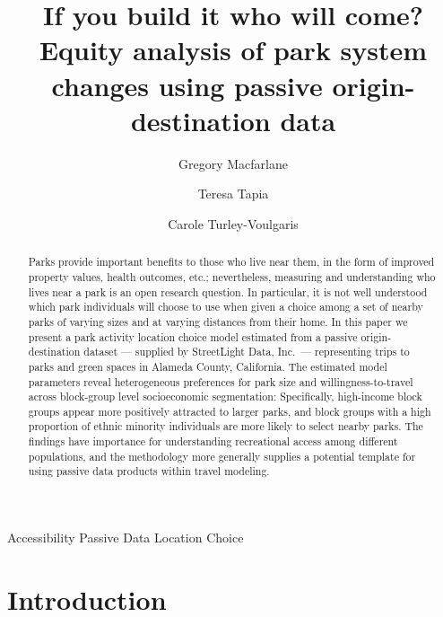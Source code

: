 \documentclass[3p, authoryear]{elsarticle} %
\begin{document}
\begin{frontmatter}

  \title{If you build it who will come? Equity analysis of park system changes using passive origin-destination data}
    \author[BYU]{Gregory Macfarlane}
    \author[StreetLight]{Teresa Tapia}
    \author[Harvard]{Carole Turley-Voulgaris}
      \address[BYU]{Brigham Young University, Civil and Environmental Engineering Department, 430 Engineering Building, Provo, Utah 84602}
    \address[Harvard]{Harvard Graduate School of Design, 48 Quincy St, Cambridge, Massachussetts 02138}
    \address[StreetLight]{StreetLight Data, Inc., San Francisco, California}
  
  \begin{abstract}
  Parks provide important benefits to those who live near them, in the form of improved property values, health outcomes, etc.; nevertheless, measuring and understanding who lives near a park is an open research question. In particular, it is not well understood which park individuals will choose to use when given a choice among a set of nearby parks of varying sizes and at varying distances from their home. In this paper we present a park activity location choice model estimated from a passive origin-destination dataset --- supplied by StreetLight Data, Inc.~--- representing trips to parks and green spaces in Alameda County, California. The estimated model parameters reveal heterogeneous preferences for park size and willingness-to-travel across block-group level socioeconomic segmentation: Specifically, high-income block groups appear more positively attracted to larger parks, and block groups with a high proportion of ethnic minority individuals are more likely to select nearby parks. The findings have importance for understanding recreational access among different populations, and the methodology more generally supplies a potential template for using passive data products within travel modeling.
  \end{abstract}
   \begin{keyword} Accessibility Passive Data Location Choice\end{keyword}
 \end{frontmatter}

\hypertarget{intro}{%
\section{Introduction}\label{intro}}
\end{document}

